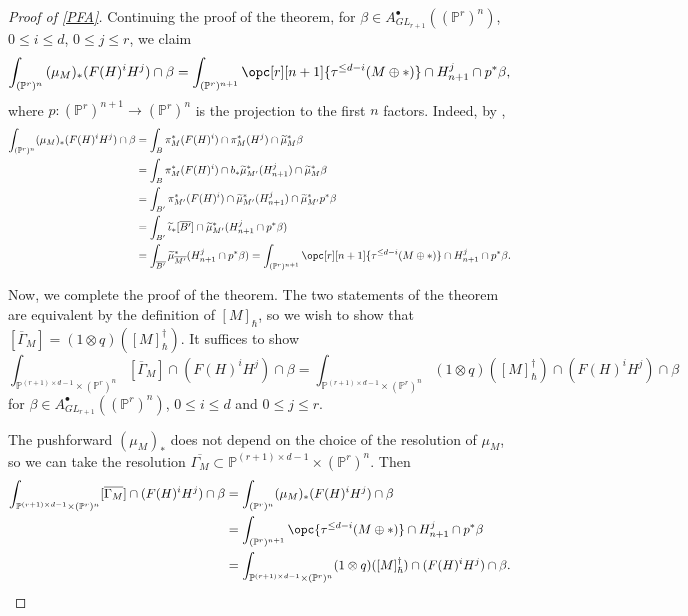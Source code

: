\documentclass[12pt]{amsart}
\newcommand{\mb}{\mathbb}
\newcommand{\ol}{\overline}
\newcommand{\wt}{\widetilde}
\theoremstyle{plain}
\theoremstyle{definition}
\theoremstyle{remark}
\begin{document}
\begin{proof}[Proof of \cref{PFA}]
Continuing the proof of the theorem, for $\beta\in A^\bullet_{GL_{r+1}}((\mb{P}^r)^n)$, $0\leq i\leq d$, $0\leq j\leq r$, we claim
\begin{equation} \label{pushforwardintegral}
\int_{(\mb{P}^r)^n}{(\mu_M)_*(F(H)^i H^j)\cap \beta}=\int_{(\mb{P}^r)^{n+1}}{\opc[r][n+1]{\tau^{\le d-i}(M \oplus \ast)}\cap H_{n+1}^j \cap p^* \beta},
\end{equation}
where $p : (\mb{P}^r)^{n+1}\to (\mb{P}^r)^{n}$ is the projection to the first $n$ factors. Indeed, by ,
\begin{align*}
\int_{(\mb{P}^r)^n} (\mu_{M})_{*}(F(H)^i H^j)\cap \beta &= \int_{B}\pi_M^*(F(H)^i) \cap \pi_M^*(H^j)\cap \wt{\mu}_{M}^*\beta \\
&= \int_{B}\pi_M^*(F(H)^i) \cap b_* \wt{\mu}_{M'}^*(H_{n+1}^j)\cap \wt{\mu}_{M}^*\beta \\
&= \int_{B'} \pi_{M'}^*(F(H)^i) \cap \wt{\mu}_{M'}^*(H_{n+1}^j) \cap \wt{\mu}_{M'}^* p^* \beta \\
&= \int_{B'} \wt{\iota}_*[\overline{B'}] \cap \wt{\mu}_{M'}^*(H_{n+1}^j \cap p^* \beta) \\
&= \int_{\overline{B'}} \wt{\mu}_{\overline{M'}}^*(H_{n+1}^j \cap p^* \beta)= \int_{(\mb{P}^r)^{n+1}}{\opc[r][n+1]{\tau^{\le d-i}(M \oplus \ast)}\cap H_{n+1}^j \cap p^* \beta}.
\end{align*}

Now, we complete the proof of the theorem. The two statements of the theorem are equivalent by the definition of $[M]_\hbar$, so we wish to show that $[\ol{\Gamma}_M] = (1 \otimes q)([M]_\hbar^\dagger)$. It suffices to show \[\int_{\mb{P}^{(r+1)\times d - 1} \times (\mb{P}^r)^n}[\ol{\Gamma}_M] \cap (F(H)^i H^j) \cap \beta = \int_{\mb{P}^{(r+1)\times d - 1} \times (\mb{P}^r)^n} (1 \otimes q)([M]_\hbar^\dagger) \cap (F(H)^i H^j) \cap \beta\] for $\beta\in A^\bullet_{GL_{r+1}}((\mb{P}^r)^n)$, $0\leq i\leq d$ and $0\leq j\leq r$.

The pushforward $(\mu_M)_*$ does not depend on the choice of the resolution of $\mu_M$, so we can take the resolution $\ol{\Gamma_M} \subset \mb{P}^{(r+1)\times d - 1} \times (\mb{P}^r)^n$. Then
\begin{align*}
\int_{\mb{P}^{(r+1)\times d - 1} \times (\mb{P}^r)^n}[\ol{\Gamma_M}] \cap (F(H)^i H^j) \cap \beta 
&=\int_{(\mb{P}^r)^n} (\mu_{M})_{*}(F(H)^i H^j)\cap \beta \\
&=\int_{(\mb{P}^r)^{n+1}}{\opc{\tau^{\le d-i}(M \oplus \ast)}\cap H_{n+1}^j \cap p^* \beta}\\
&=\int_{\mb{P}^{(r+1)\times d - 1} \times (\mb{P}^r)^n} (1 \otimes q)([M]_\hbar^\dagger) \cap (F(H)^i H^j) \cap \beta.
\end{align*}
\end{proof}
\end{document}
